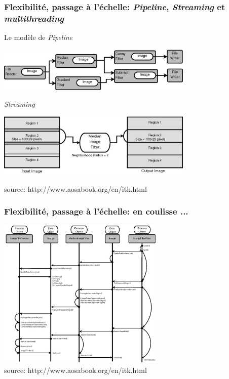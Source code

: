 \documentclass[8pt]{beamer}
\begin{document}
\begin{frame}
\frametitle{Flexibilité, passage à l'échelle: \textit{Pipeline}, \textit{Streaming} et \textit{multithreading}}

\begin{block}{Le modèle de \textit{Pipeline}}
\begin{center}
\includegraphics[width=0.7\textwidth]{images/ProcessObjectDataObject.png}
\end{center}
\end{block}
\vspace{-0.5cm}
\begin{block}{\textit{Streaming}}
\begin{center}
\includegraphics[width=0.7\textwidth]{images/StreamingImageDiagram.png}
\end{center}
\end{block}
\vspace{-0.5cm}
\begin{center}
\tiny{source: http://www.aosabook.org/en/itk.html}
\end{center}
\end{frame}

\begin{frame}
\frametitle{Flexibilité, passage à l'échelle: en coulisse ...}
\begin{center}
\includegraphics[width=0.6\textwidth]{images/ProcessObjectDataObjectInteractionUML.png}\\
\tiny{source: http://www.aosabook.org/en/itk.html}
\end{center}
\end{frame}
\end{document}

